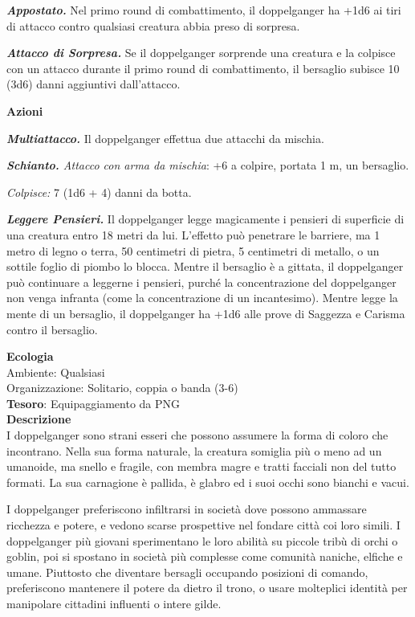 \begin{multicols}{2}
	\textit{\textbf{Appostato.}} Nel primo round di combattimento, il doppelganger ha +1d6 ai tiri di attacco contro qualsiasi creatura abbia preso di sorpresa.

	\textit{\textbf{Attacco di Sorpresa.}} Se il doppelganger sorprende una creatura e la colpisce con un attacco durante il primo round di combattimento, il bersaglio subisce 10 (3d6) danni aggiuntivi dall'attacco.

	\textbf{Azioni}

	\textit{\textbf{Multiattacco.}} Il doppelganger effettua due attacchi da mischia.

	\textit{\textbf{Schianto.} Attacco con arma da mischia}: +6 a colpire, portata 1 m, un bersaglio.

	\textit{Colpisce:} 7 (1d6 + 4) danni da botta.

	\textit{\textbf{Leggere Pensieri.}} Il doppelganger legge magicamente i pensieri di superficie di una creatura entro 18 metri da lui. L'effetto può penetrare le barriere, ma 1 metro di legno o terra, 50 centimetri di pietra, 5 centimetri di metallo, o un sottile foglio di piombo lo blocca. Mentre il bersaglio è a gittata, il doppelganger può continuare a leggerne i pensieri, purché la concentrazione del doppelganger non venga infranta (come la concentrazione di un incantesimo). Mentre legge la mente di un bersaglio, il doppelganger ha +1d6 alle prove di Saggezza e Carisma contro il bersaglio.

	\textbf{Ecologia}\\
	Ambiente: Qualsiasi\\
	Organizzazione: Solitario, coppia o banda (3-6)\\
	\textbf{Tesoro}: Equipaggiamento da PNG\\
	\textbf{Descrizione}\\
	I doppelganger sono strani esseri che possono assumere la forma di coloro che incontrano. Nella sua forma naturale, la creatura somiglia più o meno ad un umanoide, ma snello e fragile, con membra magre e tratti facciali non del tutto formati. La sua carnagione è pallida, è glabro ed i suoi occhi sono bianchi e vacui.

	I doppelganger preferiscono infiltrarsi in società dove possono ammassare ricchezza e potere, e vedono scarse prospettive nel fondare città coi loro simili. I doppelganger più giovani sperimentano le loro abilità su piccole tribù di orchi o goblin, poi si spostano in società più complesse come comunità naniche, elfiche e umane. Piuttosto che diventare bersagli occupando posizioni di comando, preferiscono mantenere il potere da dietro il trono, o usare molteplici identità per manipolare cittadini influenti o intere gilde.


\end{multicols}
